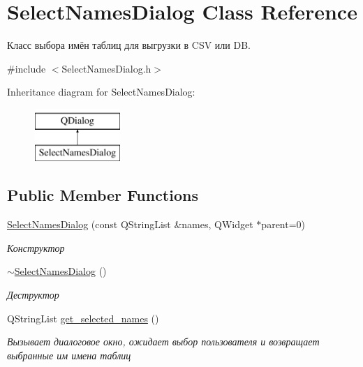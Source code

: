 \hypertarget{class_select_names_dialog}{}\section{Select\+Names\+Dialog Class Reference}
\label{class_select_names_dialog}


Класс выбора имён таблиц для выгрузки в C\+SV или DB.  




{\ttfamily \#include $<$Select\+Names\+Dialog.\+h$>$}

Inheritance diagram for Select\+Names\+Dialog\+:\begin{figure}[H]
\begin{center}
\leavevmode
\includegraphics[height=2.000000cm]{class_select_names_dialog}
\end{center}
\end{figure}
\subsection*{Public Member Functions}
\begin{DoxyCompactItemize}
\item 
\mbox{\hyperlink{class_select_names_dialog_af5d6957152caad6629fe390127f8fe90}{Select\+Names\+Dialog}} (const Q\+String\+List \&names, Q\+Widget $\ast$parent=0)
\begin{DoxyCompactList}\small\item\em Конструктор \end{DoxyCompactList}\item 
\mbox{\label{class_select_names_dialog_a054490a68f2182d983ec7c68eb1ef873}} 
\mbox{\hyperlink{class_select_names_dialog_a054490a68f2182d983ec7c68eb1ef873}{$\sim$\+Select\+Names\+Dialog}} ()
\begin{DoxyCompactList}\small\item\em Деструктор \end{DoxyCompactList}\item 
Q\+String\+List \mbox{\hyperlink{class_select_names_dialog_a063b06a2ee6f46d0aa2ae5399d18ff04}{get\+\_\+selected\+\_\+names}} ()
\begin{DoxyCompactList}\small\item\em Вызывает диалоговое окно, ожидает выбор пользователя и возвращает выбранные им имена таблиц \end{DoxyCompactList}\end{DoxyCompactItemize}


